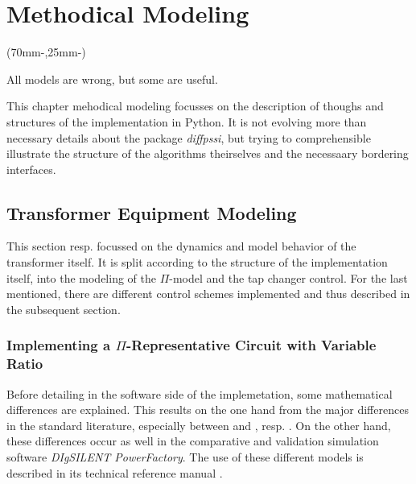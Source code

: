 
\chapter{Methodical Modeling}
\label{chap:methodical-modeling}

\begin{textblock*}{.7\textwidth}(70mm-\offset,25mm-\offset)
        \begin{fquote}
            All models are wrong, but some are useful.
        \end{fquote}
\end{textblock*}

This chapter mehodical modeling focusses on the description of thoughs and structures of the implementation in Python.
It is not evolving more than necessary details about the package {\itshape diffpssi}, but trying to comprehensible illustrate the structure of the algorithms theirselves and the necessaary bordering interfaces.

\section{Transformer Equipment Modeling}
\label{sec:transformer-modeling}

This section resp. focussed on the dynamics and model behavior of the transformer itself.
It is split according to the structure of the implementation itself, into the modeling of the $\Pi$-model and the tap changer control.
For the last mentioned, there are different control schemes implemented and thus described in the subsequent section.

\subsection{Implementing a $\Pi$-Representative Circuit with Variable Ratio}

Before detailing in the software side of the implemetation, some mathematical differences are explained.
This results on the one hand from the major differences in the standard literature, especially between \textcite{machowski_2020} and \textcite{kundur_2022}, resp. \textcite{milano_2010}.
On the other hand, these differences occur as well in the comparative and validation simulation software \textit{DIgSILENT PowerFactory}.
The use of these different models is described in its technical reference manual \quelle. 

